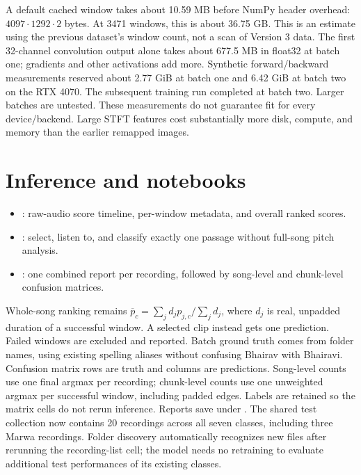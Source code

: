 \documentclass[11pt,a4paper]{article}
\begin{document}
A default cached window takes about 10.59 MB before NumPy header overhead:
$4097\cdot1292\cdot2$ bytes. At 3471 windows, this is about 36.75 GB. This is an
estimate using the previous dataset's window count, not a scan of Version 3 data.
The first 32-channel convolution output alone takes about 677.5 MB in float32 at
batch one; gradients and other activations add more. Synthetic forward/backward
measurements reserved about 2.77 GiB at batch one and 6.42 GiB at batch two on
the RTX 4070. The subsequent training run completed at batch two. Larger batches
are untested. These measurements do not guarantee fit for every device/backend.
Large STFT features cost substantially
more disk, compute, and memory than the earlier remapped images.

\section{Inference and notebooks}
\begin{itemize}
\item {}: raw-audio score timeline,
per-window metadata, and overall ranked scores.
\item {}: select, listen to, and
classify exactly one passage without full-song pitch analysis.
\item {}: one combined report per
recording, followed by song-level and chunk-level confusion matrices.
\end{itemize}
Whole-song ranking remains
$\overline p_c=\sum_j d_jp_{j,c}/\sum_jd_j$, where $d_j$ is real, unpadded duration
of a successful window. A selected clip instead gets one prediction. Failed
windows are excluded and reported. Batch ground truth comes from folder names,
using existing spelling aliases without confusing Bhairav with Bhairavi.
Confusion matrix rows are truth and columns are predictions. Song-level counts
use one final argmax per recording; chunk-level counts use one unweighted argmax
per successful window, including padded edges. Labels are retained so the matrix
cells do not rerun inference. Reports save under .
The shared test collection now contains 20 recordings across all seven classes,
including three Marwa recordings. Folder discovery automatically recognizes new
files after rerunning the recording-list cell; the model needs no retraining to
evaluate additional test performances of its existing classes.
\end{document}
